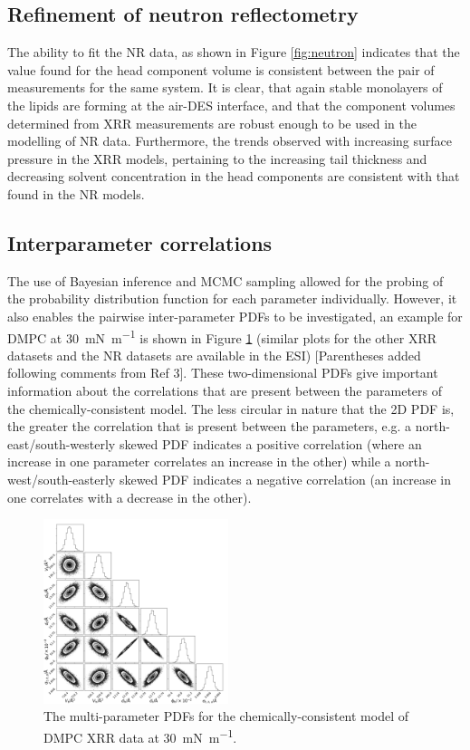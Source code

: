 \documentclass[amsmath,amssymb,twocolumn,superscriptaddress]{revtex4-1}
\begin{document}
\subsection{Refinement of neutron reflectometry}
%
The ability to fit the NR data, as shown in Figure \ref{fig:neutron} indicates that the value found for the head component volume is consistent between the pair of measurements for the same system.
It is clear, that again stable monolayers of the lipids are forming at the air-DES interface, and that the component volumes determined from XRR measurements are robust enough to be used in the modelling of NR data.
Furthermore, the trends observed with increasing surface pressure in the XRR models, pertaining to the increasing tail thickness and decreasing solvent concentration in the head components are consistent with that found in the NR models.

\subsection{Interparameter correlations}
%
The use of Bayesian inference and MCMC sampling allowed for the probing of the probability distribution function for each parameter individually.
However, it also enables the pairwise inter-parameter PDFs to be investigated, an example for DMPC at \SI{30}{\milli\newton\per\meter} is shown in Figure \ref{fig:dmpcpdfs} (similar plots for the other XRR datasets and the NR datasets are available in the ESI) [Parentheses added following comments from Ref 3].
These two-dimensional PDFs give important information about the correlations that are present between the parameters of the chemically-consistent model.
The less circular in nature that the 2D PDF is, the greater the correlation that is present between the parameters, e.g. a north-east/south-westerly skewed PDF indicates a positive correlation (where an increase in one parameter correlates an increase in the other) while a north-west/south-easterly skewed PDF indicates a negative correlation (an increase in one correlates with a decrease in the other).
%
\begin{figure}
    \centering
    \includegraphics[width=0.48\textwidth]{figures/dmpc3_all_corner}
    \caption{The multi-parameter PDFs for the chemically-consistent model of DMPC XRR data at \SI{30}{\milli\newton\per\meter}.}
    \label{fig:dmpcpdfs}
\end{figure}
%
\end{document}
